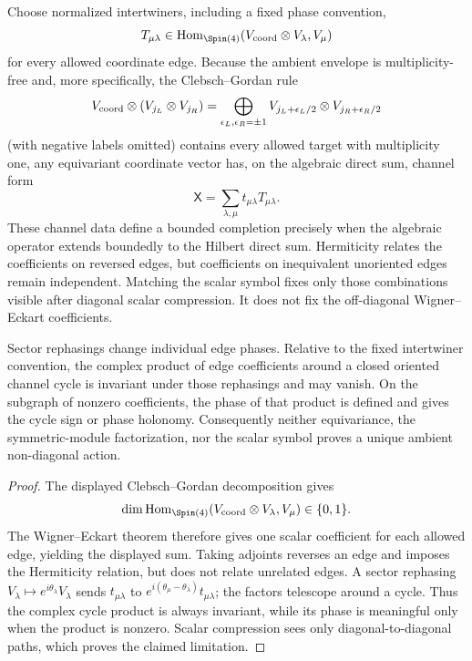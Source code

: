 \documentclass[12pt,a4paper]{article}
\begin{document}
\begin{theorem}
\label{p2:thm:derived-ambient-coordinate-action}
Choose normalized intertwiners, including a fixed phase convention,
\[
T_{\mu\lambda}\in
\operatorname{Hom}_{\Spin(4)}
(V_{\rm coord}\otimes V_\lambda,V_\mu)
\]
for every allowed coordinate edge.  Because the ambient envelope is
multiplicity-free and, more specifically, the Clebsch--Gordan rule
\[
V_{\rm coord}\otimes(V_{j_L}\otimes V_{j_R})
=
\bigoplus_{\epsilon_L,\epsilon_R=\pm1}
V_{j_L+\epsilon_L/2}\otimes V_{j_R+\epsilon_R/2}
\]
(with negative labels omitted) contains every allowed target with
multiplicity one, any equivariant coordinate vector has, on the algebraic
direct sum, channel form
\[
\mathsf X
=
\sum_{\lambda,\mu}t_{\mu\lambda}T_{\mu\lambda}.
\]
These channel data define a bounded completion precisely when the algebraic
operator extends boundedly to the Hilbert direct sum.
Hermiticity relates the coefficients on reversed edges, but coefficients on
inequivalent unoriented edges remain independent.  Matching the scalar symbol
fixes only those combinations visible after diagonal scalar compression.
It does not fix the off-diagonal Wigner--Eckart coefficients.

Sector rephasings change individual edge phases.  Relative to the fixed
intertwiner convention, the complex product of edge coefficients around a
closed oriented channel cycle is invariant under those rephasings and may
vanish.  On the subgraph of nonzero coefficients, the phase of that product
is defined and gives the cycle sign or phase holonomy.  Consequently neither
equivariance, the symmetric-module factorization, nor the scalar symbol proves
a unique ambient non-diagonal action.
\end{theorem}

\begin{proof}
The displayed Clebsch--Gordan decomposition gives
\[
\dim\operatorname{Hom}_{\Spin(4)}
(V_{\rm coord}\otimes V_\lambda,V_\mu)\in\{0,1\}.
\]
The Wigner--Eckart theorem
\cite{Wigner1959,fulton1991representation} therefore gives one scalar
coefficient for each allowed edge, yielding the displayed sum.  Taking
adjoints reverses an edge and imposes the Hermiticity
relation, but does not relate unrelated edges.  A sector rephasing
\(V_\lambda\mapsto e^{i\theta_\lambda}V_\lambda\) sends
\(t_{\mu\lambda}\) to
\(e^{i(\theta_\mu-\theta_\lambda)}t_{\mu\lambda}\); the factors telescope
around a cycle.  Thus the complex cycle product is always invariant, while
its phase is meaningful only when the product is nonzero.  Scalar compression
sees only diagonal-to-diagonal paths, which proves the claimed limitation.
\end{proof}
\end{document}
